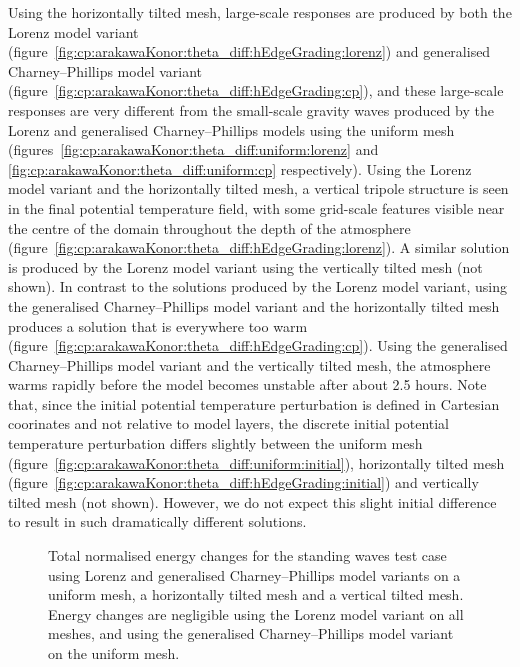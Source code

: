 Using the horizontally tilted mesh, large-scale responses are produced by both the Lorenz model variant (figure~\ref{fig:cp:arakawaKonor:theta_diff:hEdgeGrading:lorenz}) and generalised Charney--Phillips model variant (figure~\ref{fig:cp:arakawaKonor:theta_diff:hEdgeGrading:cp}), and these large-scale responses are very different from the small-scale gravity waves produced by the Lorenz and generalised Charney--Phillips models using the uniform mesh (figures~\ref{fig:cp:arakawaKonor:theta_diff:uniform:lorenz} and \ref{fig:cp:arakawaKonor:theta_diff:uniform:cp} respectively).
Using the Lorenz model variant and the horizontally tilted mesh, a vertical tripole structure is seen in the final potential temperature field, with some grid-scale features visible near the centre of the domain throughout the depth of the atmosphere (figure~\ref{fig:cp:arakawaKonor:theta_diff:hEdgeGrading:lorenz}).
A similar solution is produced by the Lorenz model variant using the vertically tilted mesh (not shown).
In contrast to the solutions produced by the Lorenz model variant, using the generalised Charney--Phillips model variant and the horizontally tilted mesh produces a solution that is everywhere too warm (figure~\ref{fig:cp:arakawaKonor:theta_diff:hEdgeGrading:cp}).
Using the generalised Charney--Phillips model variant and the vertically tilted mesh, the atmosphere warms rapidly before the model becomes unstable after about \num{2.5} hours.
Note that, since the initial potential temperature perturbation is defined in Cartesian coorinates and not relative to model layers, the discrete initial potential temperature perturbation differs slightly between the uniform mesh (figure~\ref{fig:cp:arakawaKonor:theta_diff:uniform:initial}), horizontally tilted mesh (figure~\ref{fig:cp:arakawaKonor:theta_diff:hEdgeGrading:initial}) and vertically tilted mesh (not shown).
However, we do not expect this slight initial difference to result in such dramatically different solutions.

\begin{figure}
	\centering
	
	\caption{Total normalised energy changes for the standing waves test case using Lorenz and generalised Charney--Phillips model variants on a uniform mesh, a horizontally tilted mesh and a vertical tilted mesh.
	Energy changes are negligible using the Lorenz model variant on all meshes, and using the generalised Charney--Phillips model variant on the uniform mesh.}
	\label{fig:cp:arakawaKonor:conservation}
\end{figure}

